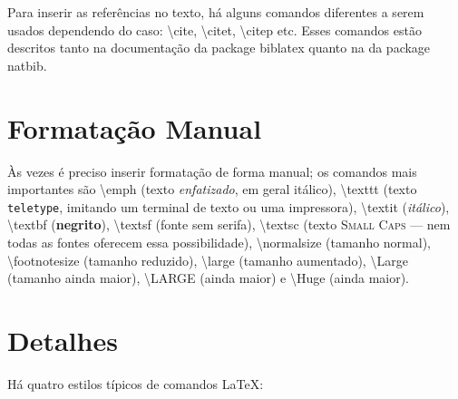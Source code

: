 Para inserir as referências no texto, há alguns comandos diferentes a
serem usados dependendo do caso:
\textsf{\textbackslash{}cite},
\textsf{\textbackslash{}citet},
\textsf{\textbackslash{}citep} etc. Esses comandos estão descritos tanto
na documentação da package biblatex quanto na da package
natbib.

\section{Formatação Manual}

Às vezes é preciso inserir formatação de forma manual; os comandos mais
importantes são \textsf{\textbackslash{}emph} (texto \emph{enfatizado}, em geral
itálico), \textsf{\textbackslash{}texttt} (texto \texttt{teletype}, imitando um
terminal de texto ou uma impressora), \textsf{\textbackslash{}textit}
(\textit{itálico}), \textsf{\textbackslash{}textbf} (\textbf{negrito}),
\textsf{\textbackslash{}textsf} (fonte \textsf{sem serifa}),
\textsf{\textbackslash{}textsc} (texto \textsc{Small Caps} --- nem todas
as fontes oferecem essa possibilidade),
\textsf{\textbackslash{}normalsize} (tamanho normal),
\textsf{\textbackslash{}footnotesize} (tamanho reduzido),
\textsf{\textbackslash{}large} (tamanho aumentado),
\textsf{\textbackslash{}Large} (tamanho ainda maior),
\textsf{\textbackslash{}LARGE} (ainda maior) e
\textsf{\textbackslash{}Huge} (ainda maior).

\section{Detalhes}

Há quatro estilos típicos de comandos \LaTeX{}:

